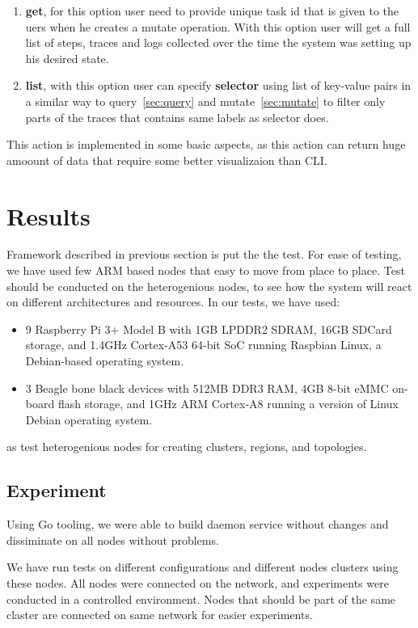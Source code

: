 \begin{enumerate}[start=1,label={(\bfseries \arabic*)}]
	\item \textbf{get}, for this option user need to provide unique task id that is given to the uers when he creates a mutate operation. With this option user will get a full list of steps, traces and logs collected over the time the system was setting up his desired state.  
	\item \textbf{list}, with this option user can specify \textbf{selector} using list of key-value pairs in a similar way to query~\ref{sec:query} and mutate~\ref{sec:mutate} to filter only parts of the traces that contains same labels as selector does.
\end{enumerate}

This action is implemented in some basic aspects, as this action can return huge amoount of data that require some better visualizaion than CLI.
%
%
\section{Results}\label{sec:results} 
Framework described in previous section is put the the test. For ease of testing, we have used few ARM based nodes that easy to move from place to place. Test should be conducted on the heterogenious nodes, to see how the system will react on different architectures and resources. In our tests, we have used:

\begin{itemize}
	\item 9 Raspberry Pi 3+ Model B with 1GB LPDDR2 SDRAM, 16GB SDCard storage, and 1.4GHz Cortex-A53 64-bit SoC running Raspbian Linux, a Debian-based operating system.
	\item 3 Beagle bone black devices with 512MB DDR3 RAM, 4GB 8-bit eMMC on-board flash storage, and 1GHz ARM Cortex-A8 running a version of Linux Debian operating system.
\end{itemize}

\noindent
as test heterogenious nodes for creating clusters, regions, and topologies. 

%
%
\subsection{Experiment}\label{sec:experiment}
%
Using Go tooling, we were able to build daemon service without changes and dissiminate on all nodes without problems.

We have run tests on different configurations and different nodes clusters using these nodes. All nodes were connected on the network, and experiments were conducted in a controlled environment. Nodes that should be part of the same claster are connected on same network for easier experiments.

